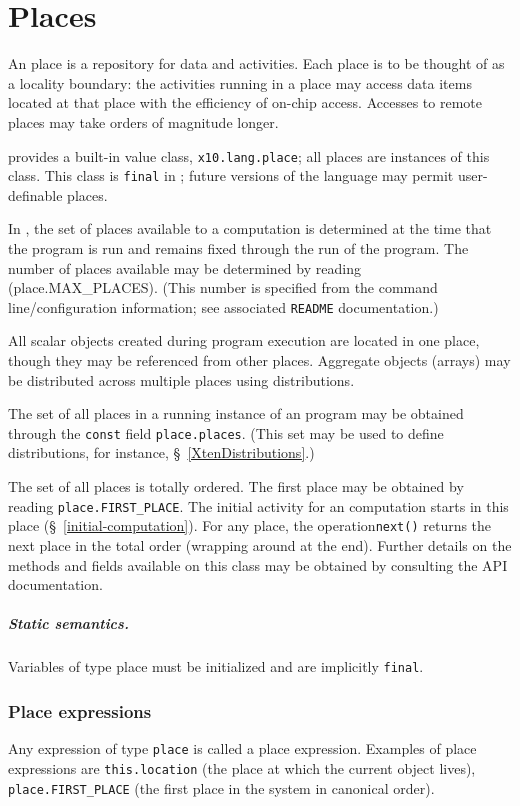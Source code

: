 \chapter{Places}\label{XtenPlaces}
\cbstart 
An \Xten{} place is a repository for data and activities. Each place
is to be thought of as a locality boundary: the activities running in
a place may access data items located at that place with the
efficiency of on-chip access. Accesses to remote places may take
orders of magnitude longer.

{}\Xten{} provides a built-in value class, {\tt x10.lang.place}; all
places are instances of this class.  This class is {\tt final} in
{}\XtenCurrVer; future versions of the language may permit
user-definable places. 

In \XtenCurrVer{}, the set of places available to a computation is
determined at the time that the program is run and remains fixed
through the run of the program. The number of places available 
may be determined by reading ({\cf place.MAX\_PLACES}). (This number
is specified from the command line/configuration information; 
see associated {\tt README} documentation.)

All scalar objects created during program execution are located in one
place, though they may be referenced from other places. Aggregate
objects (arrays) may be distributed across multiple places using
distributions.

The set of all places in a running instance of an \Xten{} program may
be obtained through the {\tt const} field {\tt place.places}.  (This
set may be used to define distributions, for instance,
\S~\ref{XtenDistributions}.) 


The set of all places is totally ordered.  The first place may be
obtained by reading {\tt place.FIRST\_PLACE}. The initial activity for
an \Xten{} computation starts in this place
(\S~\ref{initial-computation}). For any place, the operation{\tt next()}
returns the next place in the total order (wrapping around at the
end). Further details on the methods and fields available on this
class may be obtained by consulting the API documentation.


\paragraph{Static semantics.}
Variables of type {\cf place} must be initialized and are implicitly
{\tt final}.  

\cbend
\subsection{Place expressions}
Any expression of type {\tt place} is called a place expression. 
Examples of place expressions are {\tt this.location} (the place
at which the current object lives), {\tt place.FIRST\_PLACE}
(the first place in the system in canonical order). 

